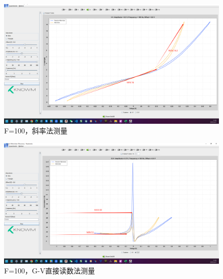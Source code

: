 \documentclass[12pt,hyperref,a4paper,UTF8]{ctexart}
\begin{document}
\begin{figure}[H]
    \centering
    \begin{minipage}{1\textwidth}
        \centering
        \includegraphics[width=1\textwidth]{figures/F1001D.png}
        \caption{F=100，斜率法测量}
        \label{fig:F100_slope_method}
    \end{minipage}
\end{figure}

\begin{figure}[H]
    \centering
    \begin{minipage}{1\textwidth}
        \centering
        \includegraphics[width=1\textwidth]{figures/F1002D.png}
        \caption{F=100，G-V直接读数法测量}
        \label{fig:F100_GV_method}
    \end{minipage}
\end{figure}
\end{document}

